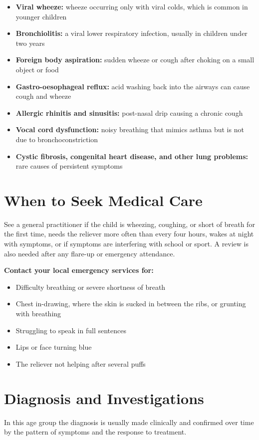 \begin{itemize}
    \item \textbf{Viral wheeze:} wheeze occurring only with viral colds, which is common in younger children
    \item \textbf{Bronchiolitis:} a viral lower respiratory infection, usually in children under two years
    \item \textbf{Foreign body aspiration:} sudden wheeze or cough after choking on a small object or food
    \item \textbf{Gastro-oesophageal reflux:} acid washing back into the airways can cause cough and wheeze
    \item \textbf{Allergic rhinitis and sinusitis:} post-nasal drip causing a chronic cough
    \item \textbf{Vocal cord dysfunction:} noisy breathing that mimics asthma but is not due to bronchoconstriction
    \item \textbf{Cystic fibrosis, congenital heart disease, and other lung problems:} rare causes of persistent symptoms
\end{itemize}

\section*{When to Seek Medical Care}
See a general practitioner if the child is wheezing, coughing, or short of breath for the first time, needs the reliever more often than every four hours, wakes at night with symptoms, or if symptoms are interfering with school or sport. A review is also needed after any flare-up or emergency attendance.

\textbf{Contact your local emergency services for:}
\begin{itemize}
    \item Difficulty breathing or severe shortness of breath
    \item Chest in-drawing, where the skin is sucked in between the ribs, or grunting with breathing
    \item Struggling to speak in full sentences
    \item Lips or face turning blue
    \item The reliever not helping after several puffs
\end{itemize}

\section*{Diagnosis and Investigations}
In this age group the diagnosis is usually made clinically and confirmed over time by the pattern of symptoms and the response to treatment.

